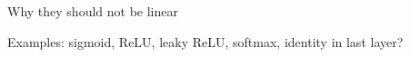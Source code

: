 Why they should not be linear

Examples: sigmoid, ReLU, leaky ReLU, softmax, identity in last layer?







